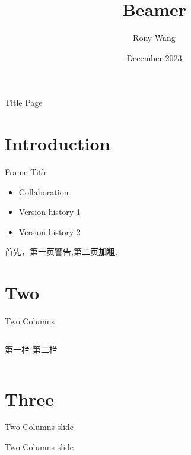 \documentclass[UTF8,aspectratio=169]{beamer}%
\title{Beamer}
\author{Rony Wang}
\date{December 2023}
\begin{document}
\maketitle

\begin{frame}{Title Page}
    \tableofcontents
\end{frame}

\section{Introduction}
\begin{frame}{Frame Title}
    \begin{itemize}
        \item<1-> Collaboration %
        \item<2-> Version history 1 %
        \item<3-> Version history 2 %
    \end{itemize}
   

    首先，第一页\alert<1>{警告},第二页\textbf<2>{加粗}.

    
\end{frame}
\section{Two}
\begin{frame}{Two Columns}
    \begin{columns}
            第一栏
            第二栏
    \end{columns}
\end{frame}

\section{Three}
\begin{frame}{Two Columns}
    slide
\end{frame}

\begin{frame}{Two Columns}
    slide
\end{frame}
\end{document}
